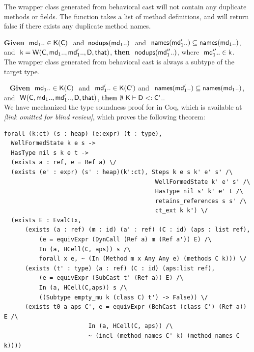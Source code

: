 \documentclass[acmsmall, anonymous, authordraft, review]{acmart} %
\begin{document}
\noindent
The wrapper class generated from behavioral cast will not contain
any duplicate methods or fields. The  function takes a 
list of method definitions, and will return false if there exists 
any duplicate method names.

\medskip{} {\bf Given} $~\md[1].. \In \App\K\C~$ $ $and$~$ $\cload{\md[1]..}~$ 
and $~\names{\mdp[1]..} \subseteq \names{\md[1]..}$,
and $~\k = \wrapE{\C,\md[1].., \mdp[1]..,\D,\that}$, {\bf then} $~\cload{\mdpp[1]..}$, where $~\mdpp[1].. \In \k$. \\

\noindent
The wrapper class generated from behavioral cast is always a subtype of the
target type.

\medskip{} ~ {\bf Given} $~\md[1]..\In\App\K\C~$ $ $and$ $ $~\mdp[1].. \In \App\K\Cp$ and 
$~\names{\mdp[1]..} \subseteq \names{\md[1]..}$, and $~\wrap\C{\md[1]..}{\mdp[1]..}\D\that $, 
{\bf then} $\StrSub\emptyset\K\D\Cp$..\\

We have mechanized the type soundness proof for \kafka in Coq,  which is
available at \emph{[link omitted for blind review]}, which proves the 
following theorem:

\begin{verbatim}
forall (k:ct) (s : heap) (e:expr) (t : type),
  WellFormedState k e s -> 
  HasType nil s k e t -> 
  (exists a : ref, e = Ref a) \/
  (exists (e' : expr) (s' : heap)(k':ct), Steps k e s k' e' s' /\
                                           WellFormedState k' e' s' /\
                                           HasType nil s' k' e' t /\
                                           retains_references s s' /\
                                           ct_ext k k') \/
  (exists E : EvalCtx,
      (exists (a : ref) (m : id) (a' : ref) (C : id) (aps : list ref),
          (e = equivExpr (DynCall (Ref a) m (Ref a')) E) /\
          In (a, HCell(C, aps)) s /\
          forall x e, ~ (In (Method m x Any Any e) (methods C k))) \/
      (exists (t' : type) (a : ref) (C : id) (aps:list ref),
          (e = equivExpr (SubCast t' (Ref a)) E) /\
          In (a, HCell(C,aps)) s /\
          ((Subtype empty_mu k (class C) t') -> False)) \/
      (exists t0 a aps C', e = equivExpr (BehCast (class C') (Ref a)) E /\
                        In (a, HCell(C, aps)) /\
                        ~ (incl (method_names C' k) (method_names C k))))
\end{verbatim}
\end{document}
